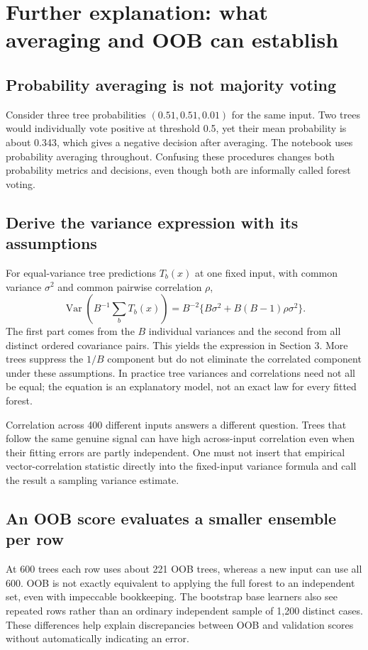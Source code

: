 \section*{Further explanation: what averaging and OOB can establish}
\subsection*{Probability averaging is not majority voting}
Consider three tree probabilities $(0.51,0.51,0.01)$ for the same input.
Two trees would individually vote positive at threshold 0.5, yet their mean probability is about 0.343,
which gives a negative decision after averaging. The notebook uses probability averaging throughout.
Confusing these procedures changes both probability metrics and decisions, even though both are informally
called forest voting.

\subsection*{Derive the variance expression with its assumptions}
For equal-variance tree predictions $T_b(x)$ at one fixed input, with common variance $\sigma^2$ and common
pairwise correlation $\rho$,
\[
\operatorname{Var}\!\left(B^{-1}\sum_bT_b(x)\right)
=B^{-2}\{B\sigma^2+B(B-1)\rho\sigma^2\}.
\]
The first part comes from the $B$ individual variances and the second from all distinct ordered covariance pairs.
This yields the expression in Section 3. More trees suppress the $1/B$ component but do not eliminate the
correlated component under these assumptions. In practice tree variances and correlations need not all be equal;
the equation is an explanatory model, not an exact law for every fitted forest.

Correlation across 400 different inputs answers a different question. Trees that follow the same genuine signal
can have high across-input correlation even when their fitting errors are partly independent. One must not insert
that empirical vector-correlation statistic directly into the fixed-input variance formula and call the result a
sampling variance estimate.

\subsection*{An OOB score evaluates a smaller ensemble per row}
At 600 trees each row uses about 221 OOB trees, whereas a new input can use all 600.
OOB is not exactly equivalent to applying the full forest to an independent set, even with impeccable bookkeeping.
The bootstrap base learners also see repeated rows rather than an ordinary independent sample of 1,200 distinct cases.
These differences help explain discrepancies between OOB and validation scores without automatically indicating an error.

